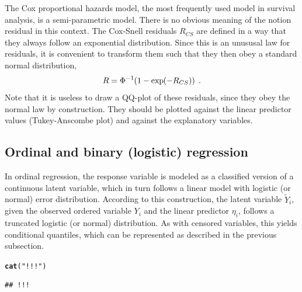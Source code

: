 \documentclass[11pt]{article}\usepackage[]{graphicx}\usepackage[]{color}
\makeatletter
\newcommand{\hlstr}[1]{\textcolor[rgb]{0.192,0.494,0.8}{#1}}%
\newcommand{\hlstd}[1]{\textcolor[rgb]{0.345,0.345,0.345}{#1}}%
\newcommand{\hlkwd}[1]{\textcolor[rgb]{0.737,0.353,0.396}{\textbf{#1}}}%
\newenvironment{kframe}{%
 \def\at@end@of@kframe{}%
 \ifinner\ifhmode%
  \def\at@end@of@kframe{\end{minipage}}%
  \begin{minipage}{\columnwidth}%
 \fi\fi%
 \def\FrameCommand##1{\hskip\@totalleftmargin \hskip-\fboxsep
 \colorbox{shadecolor}{##1}\hskip-\fboxsep
     \hskip-\linewidth \hskip-\@totalleftmargin \hskip\columnwidth}%
 \MakeFramed {\advance\hsize-\width
   \@totalleftmargin\z@ \linewidth\hsize
   \@setminipage}}%
 {\par\unskip\endMakeFramed%
 \at@end@of@kframe}
\newenvironment{knitrout}{}{} %
\makeatother
\begin{document}
The Cox proportional hazards model, the most frequently used model in
survival analysis, is a semi-parametric model. There is no obvious meaning
of the notion residual in this context. 
The Cox-Snell residuals $R_{CS}$ are defined in a way that they always
follow an exponential distribution. 
Since this is an unususal law for residuals, it is convenient to transform
them such that they then obey a standard normal distribution,
\[
  R = \Phi^{-1}\kern-2pt\left(1-\exp\kern-2pt\left(-R_{CS}\right)\right)
\;.\]
Note that it is useless to draw a QQ-plot of these residuals, since they
obey the normal law by construction. 
They should be plotted against the linear predictor values 
(Tukey-Anscombe plot) and against the explanatory variables.



\subsection{Ordinal and binary (logistic) regression}

In ordinal regression, the response variable is modeled as a classified
version of a continuous latent variable, which in turn follows a linear
model with logistic (or normal) error distribution.
According to this construction, the latent variable $\widetilde Y_i$, given the
observed ordered variable $Y_i$ and the linear predictor $\eta_i$, 
follows a truncated logistic (or normal) distribution. 
As with censored variables, this yields conditional quantiles, which
can be represented as described in the previous subsection.

\begin{knitrout}
\color{fgcolor}\begin{kframe}
\begin{alltt}
\hlkwd{cat}\hlstd{(}\hlstr{"!!!"}\hlstd{)}
\end{alltt}
\begin{verbatim}
## !!!
\end{verbatim}
\end{kframe}
\end{knitrout}
\end{document}
